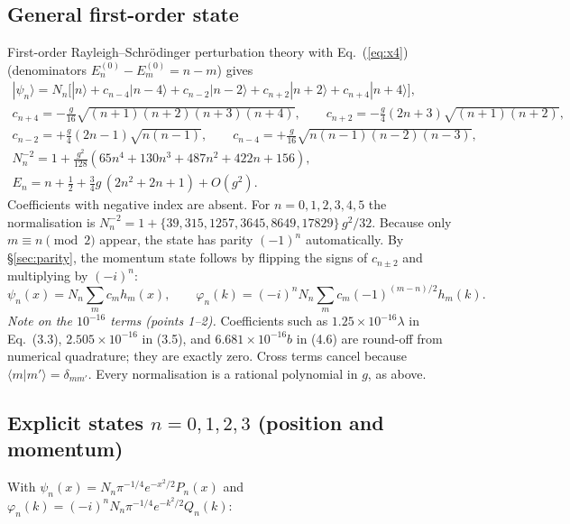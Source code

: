 \documentclass[11pt,a4paper]{article}
\newcommand{\Eq}[1]{Eq.~(#1)}
\newcommand{\ket}[1]{|#1\rangle}
\begin{document}
\subsection{General first-order state}
First-order Rayleigh--Schrödinger perturbation theory with \Eq{\ref{eq:x4}} (denominators
$E_n^{(0)}-E_m^{(0)}=n-m$) gives
\begin{gather}
\ket{\psi_n}=N_n\Big[\ket n+c_{n-4}\ket{n-4}+c_{n-2}\ket{n-2}+c_{n+2}\ket{n+2}+c_{n+4}\ket{n+4}\Big],
\label{eq:gen}\\
c_{n+4}=-\tfrac{g}{16}\sqrt{(n+1)(n+2)(n+3)(n+4)},\qquad c_{n+2}=-\tfrac g4(2n+3)\sqrt{(n+1)(n+2)},\nonumber\\
c_{n-2}=+\tfrac g4(2n-1)\sqrt{n(n-1)},\qquad c_{n-4}=+\tfrac{g}{16}\sqrt{n(n-1)(n-2)(n-3)},\nonumber\\
\boxed{N_n^{-2}=1+\frac{g^2}{128}\left(65n^4+130n^3+487n^2+422n+156\right)},\nonumber\\
\boxed{E_n=n+\tfrac12+\tfrac34g\,(2n^2+2n+1)+O(g^2)}.\nonumber
\end{gather}
Coefficients with negative index are absent. For $n=0,1,2,3,4,5$ the normalisation is
$N_n^{-2}=1+\{39,315,1257,3645,8649,17829\}\,g^2/32$. Because only $m\equiv n\pmod2$
appear, the state has parity $(-1)^n$ automatically. By \S\ref{sec:parity}, the momentum
state follows by flipping the signs of $c_{n\pm2}$ and multiplying by $(-i)^n$:
\begin{equation}
\psi_n(x)=N_n\sum_m c_m h_m(x),\qquad
\varphi_n(k)=(-i)^n N_n\sum_m c_m(-1)^{(m-n)/2}h_m(k).
\label{eq:gen_xk}
\end{equation}
\emph{Note on the $10^{-16}$ terms (points 1--2).} Coefficients such as
$1.25\times10^{-16}\lambda$ in \Eq{3.3}, $2.505\times10^{-16}$ in (3.5), and
$6.681\times10^{-16}b$ in (4.6) are round-off from numerical quadrature; they are exactly
zero. Cross terms cancel because $\langle m|m'\rangle=\delta_{mm'}$. Every normalisation is a
rational polynomial in $g$, as above.

\subsection{Explicit states $n=0,1,2,3$ (position and momentum)}
With $\psi_n(x)=N_n\pi^{-1/4}e^{-x^2/2}P_n(x)$ and $\varphi_n(k)=(-i)^nN_n\pi^{-1/4}e^{-k^2/2}Q_n(k)$:
\end{document}
